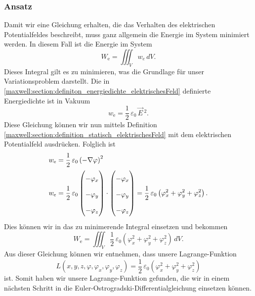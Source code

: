 \subsubsection{Ansatz}
Damit wir eine Gleichung erhalten, die das Verhalten des elektrischen Potentialfeldes beschreibt, muss ganz allgemein die Energie im System minimiert werden. 
In diesem Fall ist die Energie im System
\[
W_{\text{e}}
=
\iiint_V w_e\, dV.
\]
Dieses Integral gilt es zu minimieren, was die Grundlage für unser Variationsproblem darstellt.
Die in \eqref{maxwell:section:definiton_energiedichte_elektrischesFeld} definierte Energiedichte ist in Vakuum
\[
w_{\text{e}}
=
\frac{1}{2}\,\varepsilon_0\,\vec{E}\,^2.
\]
Diese Gleichung können wir nun mittels Definition \eqref{maxwell:section:definition_statisch_elektrischesFeld} mit dem elektrischen Potentialfeld ausdrücken.
Folglich ist
\begin{align}
\renewcommand{\arraystretch}{1.9}
w_{\text{e}}
&=
\frac{1}{2}\,\varepsilon_0\left(-\nabla\varphi\right)^2
\\
w_{\text{e}}
&=
\frac{1}{2}\,\varepsilon_0
\begin{pmatrix}
\displaystyle
-\varphi_x\\
\displaystyle
-\varphi_y\\
\displaystyle
-\varphi_z
\end{pmatrix}
\cdot
\begin{pmatrix}
\displaystyle
-\varphi_x\\
\displaystyle
-\varphi_y\\
\displaystyle
-\varphi_z
\end{pmatrix}
=
\frac{1}{2}\,\varepsilon_0\left(\varphi_x^2 + \varphi_y^2 + \varphi_z^2\right).
\label{maxwell:section:energiedichte}
\end{align}
Dies können wir in das zu minimerende Integral einsetzen und bekommen
\begin{equation}
	W_{\text{e}}
	=
	\iiint_V \frac{1}{2}\,\varepsilon_0\left(\varphi_x^2 + \varphi_y^2 + \varphi_z^2\right)\, dV.
	\label{maxwell:section:energieintegral_quellenfrei}
\end{equation}
Aus dieser Gleichung können wir entnehmen, dass unsere Lagrange-Funktion
\begin{equation}
	L(x,y,z,\varphi,\varphi_x,\varphi_y,\varphi_z)
	=
	\frac{1}{2}\,\varepsilon_0\left(\varphi_x^2 + \varphi_y^2 + \varphi_z^2\right)
	\label{maxwell:section:lagrangefunktion_quellenfrei}
\end{equation}
ist.
Somit haben wir unsere Lagrange-Funktion gefunden, die wir in einem nächsten Schritt in die Euler-Ostrogradski-Differentialgleichung einsetzen können.

